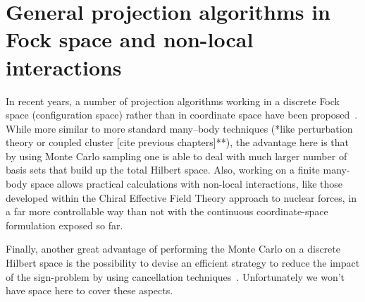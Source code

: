 \section{General projection algorithms in Fock space and non-local interactions}
In recent years, a number of projection algorithms working in a discrete Fock space (configuration 
space) rather than in coordinate space have been proposed~\cite{Alavi,Cyrus,Abhi-Alhassid,Clark-Kolodrubez}. While more similar to
more standard many--body techniques (*like perturbation theory or coupled cluster [cite previous chapters]**), 
the advantage here is that by using Monte Carlo sampling one is able to deal with much larger number
of basis sets that build up the total Hilbert space. Also, working on a finite many-body space allows
practical calculations with non-local interactions, like those developed within the Chiral Effective Field Theory
approach to nuclear forces, in a far more controllable way than not with the continuous coordinate-space
formulation exposed so far.

Finally, another great advantage of performing the Monte Carlo on a discrete Hilbert space is the possibility to
devise an efficient strategy to reduce the impact of the sign-problem by using cancellation techniques~\cite{Alavi,Cyrus}. 
Unfortunately we won't have space here to cover these aspects.

